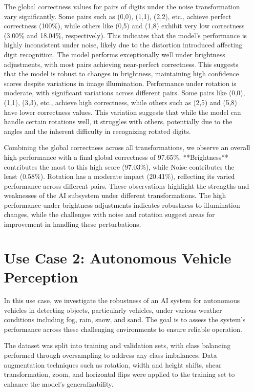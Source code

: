 The global correctness values for pairs of digits under the noise transformation vary significantly. Some pairs such as (0,0), (1,1), (2,2), etc., achieve perfect correctness (100\%), while others like (0,5) and (1,8) exhibit very low correctness (3.00\% and 18.04\%, respectively). This indicates that the model's performance is highly inconsistent under noise, likely due to the distortion introduced affecting digit recognition. The model performs exceptionally well under brightness adjustments, with most pairs achieving near-perfect correctness. This suggests that the model is robust to changes in brightness, maintaining high confidence scores despite variations in image illumination. Performance under rotation is moderate, with significant variations across different pairs. Some pairs like (0,0), (1,1), (3,3), etc., achieve high correctness, while others such as (2,5) and (5,8) have lower correctness values. This variation suggests that while the model can handle certain rotations well, it struggles with others, potentially due to the angles and the inherent difficulty in recognizing rotated digits.

Combining the global correctness across all transformations, we observe an overall high performance with a final global correctness of 97.65\%. **Brightness** contributes the most to this high score (97.03\%), while Noise contributes the least (0.58\%). Rotation has a moderate impact (20.41\%), reflecting its varied performance across different pairs. These observations highlight the strengths and weaknesses of the AI subsystem under different transformations. The high performance under brightness adjustments indicates robustness to illumination changes, while the challenges with noise and rotation suggest areas for improvement in handling these perturbations.


\section{Use Case 2: Autonomous Vehicle Perception}

In this use case, we investigate the robustness of an AI system for autonomous vehicles in detecting objects, particularly vehicles, under various weather conditions including fog, rain, snow, and sand. The goal is to assess the system's performance across these challenging environments to ensure reliable operation.

The dataset was split into training and validation sets, with class balancing performed through oversampling to address any class imbalances. Data augmentation techniques such as rotation, width and height shifts, shear transformation, zoom, and horizontal flips were applied to the training set to enhance the model's generalizability.

